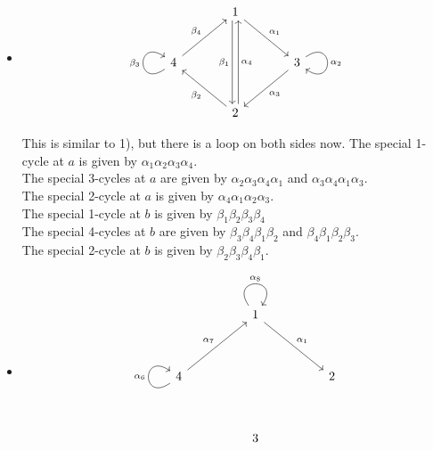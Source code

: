 \documentclass{amsart}
\numberwithin{figure}{section}
\begin{document}
\begin{itemize}
\begin{itemize}
    \item[$C_c^1$: ] $\alpha_1\alpha_2\alpha_3$ 
    \item[$C_c^2$: ] $\alpha_2\alpha_3\alpha_1$ 
    \item[$C_c^3$: ] $\alpha_3\alpha_1\alpha_2$ 
    \item[$C_d^3: $] $\beta_1\beta_2\beta_3\beta_4$
\end{itemize}
\item[5)] 
\leavevmode
\begin{center}
    \[\begin{tikzcd}[sep=large]
	& 1 & \\
	4 && 3 \\
	& 2
	\arrow["{\alpha_1}", from=1-2, to=2-3]
	\arrow["{\beta_1}"', shift right, from=1-2, to=3-2]
	\arrow["{\beta_4}", from=2-1, to=1-2]
	\arrow["{\beta_3}", from=2-1, to=2-1, loop, in=145, out=215, distance=10mm]
	\arrow["{\alpha_2}", from=2-3, to=2-3, loop, in=325, out=35, distance=10mm]
	\arrow["{\alpha_3}", from=2-3, to=3-2]
	\arrow["{\alpha_4}"', shift right, from=3-2, to=1-2]
	\arrow["{\beta_2}", from=3-2, to=2-1]
\end{tikzcd}\]
\end{center}
This is similar to 1), but there is a loop on both sides now. The special 1-cycle at $a$ is given by $\alpha_1\alpha_2\alpha_3\alpha_4$.\\
The special 3-cycles at $a$ are given by $\alpha_2\alpha_3\alpha_4\alpha_1$ and $\alpha_3\alpha_4\alpha_1\alpha_3$.\\
The special 2-cycle at $a$ is given by $\alpha_4\alpha_1\alpha_2\alpha_3$.\\
The special 1-cycle at $b$ is given by $\beta_1\beta_2\beta_3\beta_4$\\
The special 4-cycles at $b$ are given by $\beta_3\beta_4\beta_1\beta_2$ and $\beta_4\beta_1\beta_2\beta_3$.\\
The special 2-cycle at $b$ is given by $\beta_2\beta_3\beta_4\beta_1$.
\item[6) ]
\leavevmode
\[\begin{tikzcd}
	&& 1 && \\
	\\
	4 &&&& 2 \\
	\\
	&& 3
	\arrow["{\alpha_8}", from=1-3, to=1-3, loop, in=55, out=125, distance=10mm]
	\arrow["{\alpha_1}", from=1-3, to=3-5]
	\arrow["{\alpha_7}", from=3-1, to=1-3]
	\arrow["{\alpha_6}", from=3-1, to=3-1, loop, in=145, out=215, distance=10mm]

\end{tikzcd}\]
\end{itemize}
\end{document}
